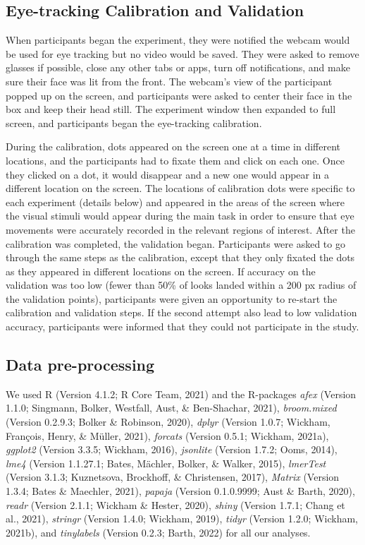 \documentclass[
  man,floatsintext]{apa6}
\begin{document}
\hypertarget{eye-tracking-calibration-and-validation}{%
\subsection{Eye-tracking Calibration and Validation}\label{eye-tracking-calibration-and-validation}}

When participants began the experiment, they were notified the webcam
would be used for eye tracking but no video would be saved. They were
asked to remove glasses if possible, close any other tabs or apps, turn
off notifications, and make sure their face was lit from the front. The
webcam's view of the participant popped up on the screen, and
participants were asked to center their face in the box and keep their
head still. The experiment window then expanded to full screen, and
participants began the eye-tracking calibration.

During the calibration, dots appeared on the screen one at a time in
different locations, and the participants had to fixate them and click
on each one. Once they clicked on a dot, it would disappear and a new
one would appear in a different location on the screen. The locations of
calibration dots were specific to each experiment (details below) and
appeared in the areas of the screen where the visual stimuli would
appear during the main task in order to ensure that eye movements were
accurately recorded in the relevant regions of interest. After the
calibration was completed, the validation began. Participants were asked
to go through the same steps as the calibration, except that they only
fixated the dots as they appeared in different locations on the screen.
If accuracy on the validation was too low (fewer than 50\% of looks
landed within a 200 px radius of the validation points),
participants were given an opportunity to re-start the calibration and
validation steps. If the second attempt also lead to low validation
accuracy, participants were informed that they could not participate in
the study.

\hypertarget{data-pre-processing}{%
\subsection{Data pre-processing}\label{data-pre-processing}}

We used R (Version 4.1.2; R Core Team, 2021) and the R-packages \emph{afex} (Version 1.1.0; Singmann, Bolker, Westfall, Aust, \& Ben-Shachar, 2021), \emph{broom.mixed} (Version 0.2.9.3; Bolker \& Robinson, 2020), \emph{dplyr} (Version 1.0.7; Wickham, François, Henry, \& Müller, 2021), \emph{forcats} (Version 0.5.1; Wickham, 2021a), \emph{ggplot2} (Version 3.3.5; Wickham, 2016), \emph{jsonlite} (Version 1.7.2; Ooms, 2014), \emph{lme4} (Version 1.1.27.1; Bates, Mächler, Bolker, \& Walker, 2015), \emph{lmerTest} (Version 3.1.3; Kuznetsova, Brockhoff, \& Christensen, 2017), \emph{Matrix} (Version 1.3.4; Bates \& Maechler, 2021), \emph{papaja} (Version 0.1.0.9999; Aust \& Barth, 2020), \emph{readr} (Version 2.1.1; Wickham \& Hester, 2020), \emph{shiny} (Version 1.7.1; Chang et al., 2021), \emph{stringr} (Version 1.4.0; Wickham, 2019), \emph{tidyr} (Version 1.2.0; Wickham, 2021b), and \emph{tinylabels} (Version 0.2.3; Barth, 2022) for all our analyses.
\end{document}
